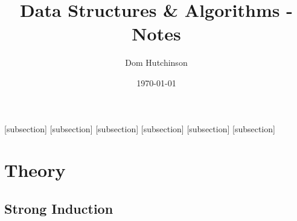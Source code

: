 \documentclass[11pt,a4paper]{article}
\begin{document}
\pagestyle{fancy}
\setlength\parindent{0pt}
\allowdisplaybreaks

[subsection]
[subsection]
[subsection]
[subsection]
[subsection]
[subsection]

\newcommand{\nats}[0]{\mathbb{N}}
\newcommand{\real}[0]{\mathbb{R}}
\newcommand{\definition}[1]{\stepcounter{definition} \textbf{Definition \arabic{subsection}.\arabic{definition}\ - }\textit{#1}\\}
\newcommand{\example}[1]{\stepcounter{example} \textbf{Example \arabic{subsection}.\arabic{example}\ - }\textit{#1}\\}
\newcommand{\proof}[1]{\stepcounter{proof} \textbf{Proof \arabic{subsection}.\arabic{proof}\ - }\textit{#1}\\}
\newcommand{\proposition}[1]{\stepcounter{proposition} \textbf{Proposition \arabic{subsection}.\arabic{proposition}\ - }\textit{#1}\\}
\newcommand{\remark}[1]{\stepcounter{remark} \textbf{Remark \arabic{subsection}.\arabic{remark}\ - }\textit{#1}\\}
\newcommand{\theorem}[1]{\stepcounter{theorem} \textbf{Theorem \arabic{subsection}.\arabic{theorem}\ - }\textit{#1}\\}
\newcommand{\nb}[0]{\textit{N.B.} - }

\renewcommand{\headrulewidth}{0pt}

  {\lstset{mathescape=true}}
  {}

\title{Data Structures \& Algorithms -  Notes}
\author{Dom Hutchinson}
\date{\today}
\maketitle

\fancyhead[R]{\today}

\tableofcontents

\newpage
\section{Theory}

\subsection{Strong Induction}
\end{document}
